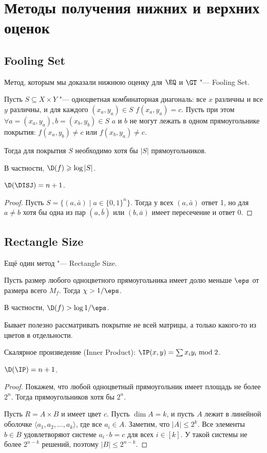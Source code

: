 \chapter{Методы получения нижних и верхних оценок}
\section{Fooling Set}
Метод, которым мы доказали нижнюю оценку для $\EQ$ и $\GT$ "--- Fooling Set.

\begin{lemma}
Пусть $S\subseteq X\times Y$ "--- одноцветная комбинаторная диагональ: все $x$ различны и все $y$ различны, и для каждого $(x_a, y_a)\in S$ $f(x_a, y_a) = c$. Пусть при этом $\forall a=(x_a, y_a), b=(x_b, y_b)\in S$ $a$ и $b$ не могут лежать в одном прямоугольнике покрытия: $f(x_a, y_b)\neq c$ или $f(x_b, y_a)\neq c$.

Тогда для покрытия $S$ необходимо хотя бы $|S|$ прямоугольников.

В частности, $\D(f) \geqslant \log |S|$.
\end{lemma}

\begin{theorem}
$\D(\DISJ) = n + 1$.
\end{theorem}
\begin{proof}
Пусть $S = \{(a, \bar a)\mid a\in \{0, 1\}^n\}$. Тогда у всех $(a, \bar a)$ ответ 1, но для $a\neq b$ хотя бы одна из пар $(a, \bar b)$ или $(b, \bar a)$ имеет пересечение и ответ 0.
\end{proof}

\section{Rectangle Size}
Ещё один метод "--- Rectangle Size.
\begin{lemma}
Пусть размер любого одноцветного прямоугольника имеет долю меньше $\eps$ от размера всего $M_f$. Тогда $\chi>1/\eps$.

В частности, $\D(f)>\log 1/\eps$.
\end{lemma}
\begin{remark}
Бывает полезно рассматривать покрытие не всей матрицы, а только какого-то из цветов в отдельности.
\end{remark}

Скалярное произведение (Inner Product): $\IP(x, y) = \sum x_iy_i \bmod 2$.

\begin{theorem}
$\D(\IP) = n + 1$.
\end{theorem}
\begin{proof}
Покажем, что любой одноцветный прямоугольник имеет площадь не более $2^n$. Тогда прямоугольников хотя бы $2^n$.

Пусть $R = A\times B$ и имеет цвет $c$. Пусть $\dim A = k$, и пусть $A$ лежит в линейной оболочке $\langle a_1, a_2, \ldots, a_k\rangle$, где все $a_i\in A$. Заметим, что $|A|\leqslant 2^k$.
Все элементы $b\in B$ удовлетворяют системе $a_i\cdot b = c$ для всех $i\in [k]$. У такой системы не более $2^{n-k}$ решений, поэтому $|B|\leqslant 2^{n-k}$.
\end{proof}

